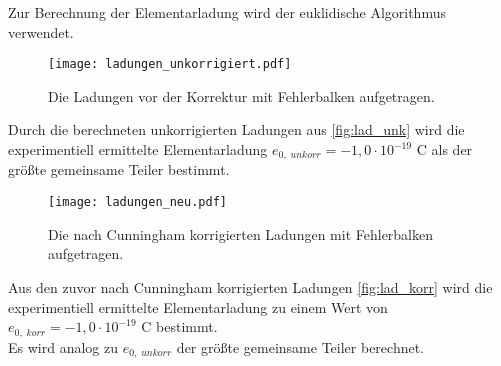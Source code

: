 Zur Berechnung der Elementarladung wird der euklidische Algorithmus verwendet.\\

\begin{figure}
  \centering
  \texttt{[image: ladungen\_unkorrigiert.pdf]}
  \caption{Die Ladungen vor der Korrektur mit Fehlerbalken aufgetragen.}
  \label{fig:lad_unk}
\end{figure}

Durch die berechneten unkorrigierten Ladungen aus \autoref{fig:lad_unk} wird die experimentiell ermittelte Elementarladung $e_{0, \; unkorr} = -1,0 \cdot 10^{-19}$ C als der größte gemeinsame Teiler 
bestimmt. \\


\begin{figure}
  \centering
  \texttt{[image: ladungen\_neu.pdf]}
  \caption{Die nach Cunningham korrigierten Ladungen mit Fehlerbalken aufgetragen.}
  \label{fig:lad_korr}
\end{figure}
Aus den zuvor nach Cunningham korrigierten Ladungen \autoref{fig:lad_korr} wird die experimentiell ermittelte Elementarladung zu einem Wert von $e_{0, \; korr} = -1,0 \cdot 10^{-19}$ C bestimmt. \\
Es wird analog zu $e_{0, \; unkorr}$ der größte gemeinsame Teiler berechnet.\\ 